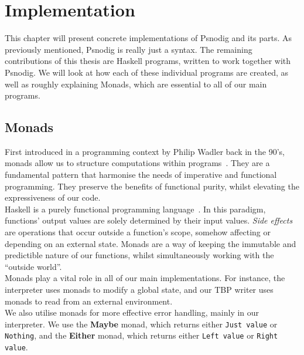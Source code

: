 \chapter{Implementation}

This chapter will present concrete implementations of Psnodig and its parts. As previously mentioned, Psnodig is really just a syntax. The remaining contributions of this thesis are Haskell programs, written to work together with Psnodig. We will look at how each of these individual programs are created, as well as roughly explaining Monads, which are essential to all of our main programs. \hfill \\


\section{Monads}

First introduced in a programming context by Philip Wadler back in the 90's, monads allow us to structure computations within programs~\cite{wadler_monads, leifharald_master}. They are a fundamental pattern that harmonise the needs of imperative and functional programming. They preserve the benefits of functional purity, whilst elevating the expressiveness of our code. \hfill \\

Haskell is a purely functional programming language~\cite{haskell}. In this paradigm, functions' output values are solely determined by their input values. \textit{Side effects} are operations that occur outside a function's scope, somehow affecting or depending on an external state. Monads are a way of keeping the immutable and predictible nature of our functions, whilst simultaneously working with the ``outside world''. \hfill \\

Monads play a vital role in all of our main implementations. For instance, the interpreter uses monads to modify a global state, and our TBP writer uses monads to read from an external environment. \hfill \\

We also utilise monads for more effective error handling, mainly in our interpreter. We use the \textbf{Maybe} monad, which returns either \texttt{Just value} or \texttt{Nothing}, and the \textbf{Either} monad, which returns either \texttt{Left value} or \texttt{Right value}. \hfill \\

